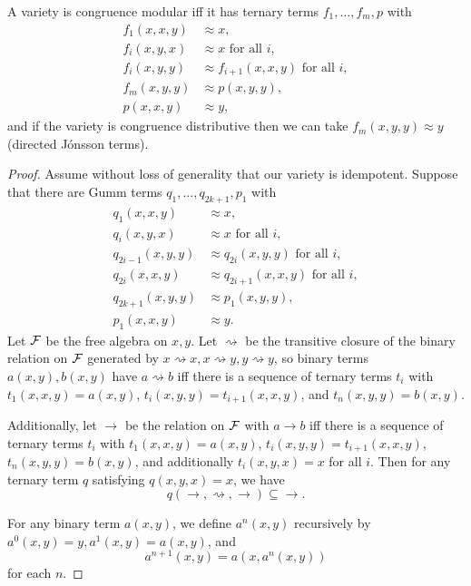 \begin{appendices}
\begin{thm}\label{directed-gumm-terms} A variety is congruence modular iff it has ternary terms $f_1, ..., f_m, p$ with
\begin{align*}
f_1(x,x,y) &\approx x,\\
f_i(x,y,x) &\approx x\text{ for all }i,\\
f_i(x,y,y) &\approx f_{i+1}(x,x,y)\text{ for all }i,\\
f_m(x,y,y) &\approx p(x,y,y),\\
p(x,x,y) &\approx y,
\end{align*}
and if the variety is congruence distributive then we can take $f_m(x,y,y) \approx y$ (directed J\'onsson terms).
\end{thm}
\begin{proof} Assume without loss of generality that our variety is idempotent. Suppose that there are Gumm terms $q_1, ..., q_{2k+1}, p_1$ with
\begin{align*}
q_1(x,x,y) &\approx x,\\
q_i(x,y,x) &\approx x\text{ for all }i,\\
q_{2i-1}(x,y,y) &\approx q_{2i}(x,y,y)\text{ for all }i,\\
q_{2i}(x,x,y) &\approx q_{2i+1}(x,x,y)\text{ for all }i,\\
q_{2k+1}(x,y,y) &\approx p_1(x,y,y),\\
p_1(x,x,y) &\approx y.
\end{align*}
Let $\mathcal{F}$ be the free algebra on $x,y$. Let $\rightsquigarrow$ be the transitive closure of the binary relation on $\mathcal{F}$ generated by $x\rightsquigarrow x, x\rightsquigarrow y, y\rightsquigarrow y$, so binary terms $a(x,y),b(x,y)$ have $a \rightsquigarrow b$ iff there is a sequence of ternary terms $t_i$ with $t_1(x,x,y) = a(x,y)$, $t_i(x,y,y) = t_{i+1}(x,x,y)$, and $t_n(x,y,y) = b(x,y)$.

Additionally, let $\rightarrow$ be the relation on $\mathcal{F}$ with $a \rightarrow b$ iff there is a sequence of ternary terms $t_i$ with $t_1(x,x,y) = a(x,y)$, $t_i(x,y,y) = t_{i+1}(x,x,y)$, $t_n(x,y,y) = b(x,y)$, and additionally $t_i(x,y,x) = x$ for all $i$. Then for any ternary term $q$ satisfying $q(x,y,x) = x$, we have
\[
q(\rightarrow,\rightsquigarrow,\rightarrow) \subseteq \rightarrow.
\]

For any binary term $a(x,y)$, we define $a^n(x,y)$ recursively by $a^0(x,y) = y, a^1(x,y) = a(x,y)$, and
\[
a^{n+1}(x,y) = a(x,a^n(x,y))
\]
for each $n$.


\end{proof}
\end{appendices}
